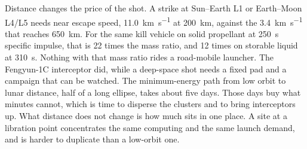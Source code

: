 \documentclass{article}
\begin{document}
Distance changes the price of the shot. A strike at Sun--Earth L1 or Earth--Moon L4/L5 needs near escape speed, \SI{11.0}{\kilo\meter\per\second} at \SI{200}{\kilo\meter}, against the \SI{3.4}{\kilo\meter\per\second} that reaches \SI{650}{\kilo\meter}. For the same kill vehicle on solid propellant at \SI{250}{\second} specific impulse, that is 22 times the mass ratio, and 12 times on storable liquid at \SI{310}{\second}. Nothing with that mass ratio rides a road-mobile launcher. The Fengyun-1C interceptor did, while a deep-space shot needs a fixed pad and a campaign that can be watched. The minimum-energy path from low orbit to lunar distance, half of a long ellipse, takes about five days. Those days buy what minutes cannot, which is time to disperse the clusters and to bring interceptors up. What distance does not change is how much sits in one place. A site at a libration point concentrates the same computing and the same launch demand, and is harder to duplicate than a low-orbit one.
\end{document}
